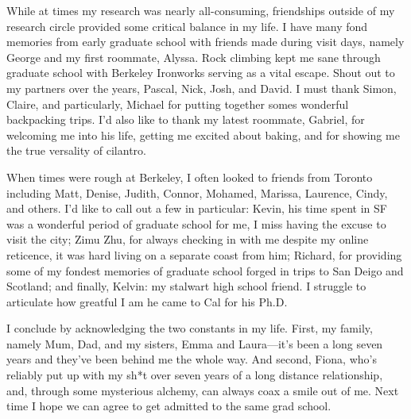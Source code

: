 While at times my research was nearly all-consuming, friendships outside of my
research circle provided some critical balance in my life. I have many fond
memories from early graduate school with friends made during visit days, namely
George and my first roommate, Alyssa. Rock climbing kept me sane through
graduate school with Berkeley Ironworks serving as a vital escape. Shout out to
my partners over the years, Pascal, Nick, Josh, and David. I must thank Simon,
Claire, and particularly, Michael for putting together somes wonderful
backpacking trips. I'd also like to thank my latest roommate, Gabriel, for
welcoming me into his life, getting me excited about baking, and for showing me
the true versality of cilantro.

When times were rough at Berkeley, I often looked to friends from Toronto
including Matt, Denise, Judith, Connor, Mohamed, Marissa, Laurence, Cindy, and
others. I'd like to call out a few in particular: Kevin, his time spent in SF
was a wonderful period of graduate school for me, I miss having the excuse to
visit the city; Zimu Zhu, for always checking in with me despite my online
reticence, it was hard living on a separate coast from him; Richard, for
providing some of my fondest memories of graduate school forged in trips to San
Deigo and Scotland; and finally, Kelvin: my stalwart high school friend. I
struggle to articulate how greatful I am he came to Cal for his Ph.D.

I conclude by acknowledging the two constants in my life. First, my family,
namely Mum, Dad, and my sisters, Emma and Laura---it's been a long seven years
and they've been behind me the whole way. And second, Fiona, who's reliably put
up with my sh*t over seven years of a long distance relationship, and, through
some mysterious alchemy, can always coax a smile out of me. Next time I hope we
can agree to get admitted to the same grad school.
